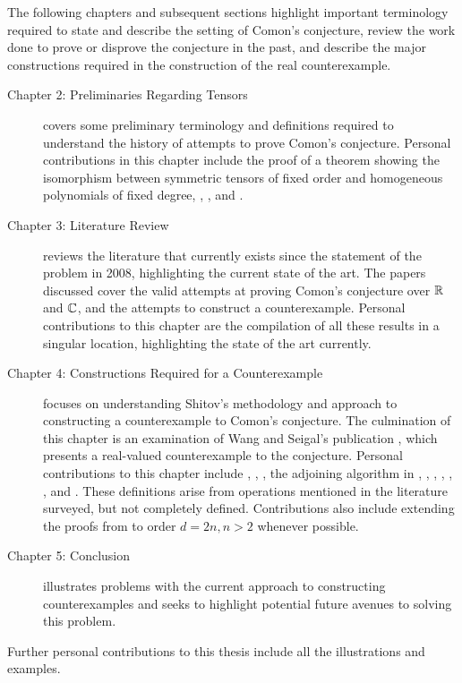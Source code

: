 \documentclass[../Lael_John_MasterThesis_Draft.tex]{subfiles}
\begin{document}
The following chapters and subsequent sections highlight important terminology required to state and describe the setting of Comon's conjecture, review the work done to prove or disprove the conjecture in the past, and describe the major constructions required in the construction of the real counterexample.
\begin{description}
    \item[Chapter 2: Preliminaries Regarding Tensors] covers some preliminary terminology and definitions required to understand the history of attempts to prove Comon's conjecture. Personal contributions in this chapter include the proof of a theorem showing the isomorphism between symmetric tensors of fixed order and homogeneous polynomials of fixed degree, , ,  and . 
    \item[Chapter 3: Literature Review] reviews the literature that currently exists since the statement of the problem in 2008, highlighting the current state of the art. The papers discussed cover the valid attempts at proving Comon's conjecture over $\mathbb{R}$ and $\mathbb{C}$, and the attempts to construct a counterexample. Personal contributions to this chapter are the compilation of all these results in a singular location, highlighting the state of the art currently.
    \item[Chapter 4: Constructions Required for a Counterexample] focuses on understanding Shitov's methodology and approach to constructing a counterexample to Comon's conjecture. The culmination of this chapter is an examination of Wang and Seigal's publication \cite{wang_lower_2023}, which presents a real-valued counterexample to the conjecture. Personal contributions to this chapter include , , , the adjoining algorithm in , , , , , ,  and . These definitions arise from operations mentioned in the literature surveyed, but not completely defined. Contributions also include extending the proofs from \cite{wang_lower_2023} to order $d = 2n, n > 2$ whenever possible. 
    \item[Chapter 5: Conclusion] illustrates problems with the current approach to constructing counterexamples and seeks to highlight potential future avenues to solving this problem. 
\end{description}
Further personal contributions to this thesis include all the illustrations and examples.
\end{document}
